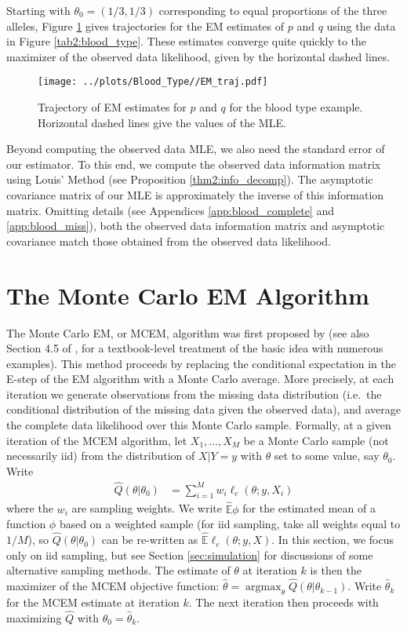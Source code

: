 \documentclass[11pt, oneside]{article}   	%
\newcommand{\bE}{\mathbb{E}}
\DeclareMathOperator*{\argmax}{argmax}
\begin{document}
Starting with $\theta_0 = (1/3, 1/3)$ corresponding to equal proportions of the three alleles, Figure \ref{fig:blood_EM_traj} gives trajectories for the EM estimates of $p$ and $q$ using the data in Figure \ref{tab2:blood_type}. These estimates converge quite quickly to the maximizer of the observed data likelihood, given by the horizontal dashed lines.
%
\begin{figure}
    \centering
    \caption{Trajectory of EM estimates for $p$ and $q$ for the blood type example. Horizontal dashed lines give the values of the MLE.}
    \label{fig:blood_EM_traj}
    \texttt{[image: ../plots/Blood\_Type//EM\_traj.pdf]}
\end{figure}
%
Beyond computing the observed data MLE, we also need the standard error of our estimator. To this end, we compute the observed data information matrix using Louis' Method (see Proposition \ref{thm2:info_decomp}). The asymptotic covariance matrix of our MLE is approximately the inverse of this information matrix. Omitting details (see Appendices \ref{app:blood_complete} and \ref{app:blood_miss}), both the observed data information matrix and asymptotic covariance match those obtained from the observed data likelihood. 
%


\section{The Monte Carlo EM Algorithm}
\label{sec:MCEM}

The Monte Carlo EM, or MCEM, algorithm was first proposed by \citet{Wei90} (see also Section 4.5 of \citealp{Tan96}, for a textbook-level treatment of the basic idea with numerous examples). This method proceeds by replacing the conditional expectation in the E-step of the EM algorithm with a Monte Carlo average. More precisely, at each iteration we generate observations from the missing data distribution (i.e.\ the conditional distribution of the missing data given the observed data), and average the complete data likelihood over this Monte Carlo sample. Formally, at a given iteration of the MCEM algorithm, let $X_1,\ldots, X_M$ be a Monte Carlo sample (not necessarily iid) from the distribution of $X|Y=y$ with $\theta$ set to some value, say $\theta_0$. Write
%
\begin{align}
    \hat{Q}(\theta|\theta_0) &= \sum_{i=1}^M w_i \ell_c(\theta; y, X_i) \label{eq:MCEM_objective}
\end{align}
%
where the $w_i$ are sampling weights. We write $\hat{\bE} \phi$ \index{$\hat{\bE}$} for the estimated mean of a function $\phi$ based on a weighted sample (for iid sampling, take all weights equal to $1/M$), so $\hat{Q}(\theta|\theta_0)$ can be re-written as $\hat{\bE} \ell_c (\theta; y, X)$. In this section, we focus only on iid sampling, but see Section \ref{sec:simulation} for discussions of some alternative sampling methods. The estimate of $\theta$ at iteration $k$ is then the maximizer of the MCEM objective function: $\hat{\theta} = \argmax_\theta \hat{Q}(\theta|\theta_{k-1})$. Write $\hat{\theta}_{k}$ for the MCEM estimate at iteration $k$. The next iteration then proceeds with maximizing $\hat{Q}$ with $\theta_0 = \hat{\theta}_k$.  
\end{document}
